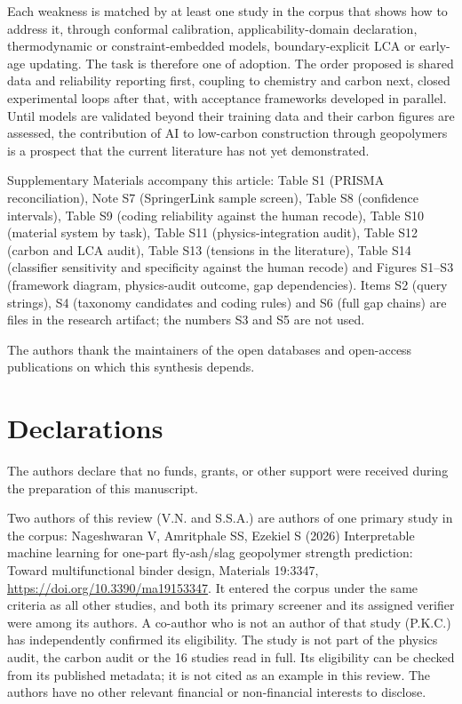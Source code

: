 \documentclass[pdflatex,sn-basic]{sn-jnl}
\begin{document}
Each weakness is matched by at least one study in the corpus that shows how to address it, through conformal calibration, applicability-domain declaration, thermodynamic or constraint-embedded models, boundary-explicit LCA or early-age updating. The task is therefore one of adoption. The order proposed is shared data and reliability reporting first, coupling to chemistry and carbon next, closed experimental loops after that, with acceptance frameworks developed in parallel. Until models are validated beyond their training data and their carbon figures are assessed, the contribution of AI to low-carbon construction through geopolymers is a prospect that the current literature has not yet demonstrated.

\backmatter

Supplementary Materials accompany this article: Table S1 (PRISMA reconciliation), Note S7 (SpringerLink sample screen), Table S8 (confidence intervals), Table S9 (coding reliability against the human recode), Table S10 (material system by task), Table S11 (physics-integration audit), Table S12 (carbon and LCA audit), Table S13 (tensions in the literature), Table S14 (classifier sensitivity and specificity against the human recode) and Figures S1--S3 (framework diagram, physics-audit outcome, gap dependencies). Items S2 (query strings), S4 (taxonomy candidates and coding rules) and S6 (full gap chains) are files in the research artifact; the numbers S3 and S5 are not used.

The authors thank the maintainers of the open databases and open-access publications on which this synthesis depends.

\section*{Declarations}

The authors declare that no funds, grants, or other support were received during the preparation of this manuscript.

Two authors of this review (V.N. and S.S.A.) are authors of one primary study in the corpus: Nageshwaran V, Amritphale SS, Ezekiel S (2026) Interpretable machine learning for one-part fly-ash/slag geopolymer strength prediction: Toward multifunctional binder design, Materials 19:3347, \url{https://doi.org/10.3390/ma19153347}. It entered the corpus under the same criteria as all other studies, and both its primary screener and its assigned verifier were among its authors. A co-author who is not an author of that study (P.K.C.) has independently confirmed its eligibility. The study is not part of the physics audit, the carbon audit or the 16 studies read in full. Its eligibility can be checked from its published metadata; it is not cited as an example in this review. The authors have no other relevant financial or non-financial interests to disclose.
\end{document}

